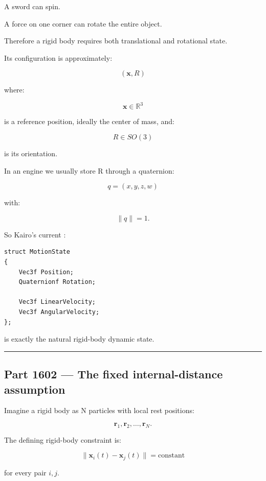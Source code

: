 A sword can spin.

A force on one corner can rotate the entire object.

Therefore a rigid body requires both translational and rotational state.

Its configuration is approximately:

\[
(\mathbf{x},R)
\]

where:

\[
\mathbf{x}\in\mathbb{R}^{3}
\]

is a reference position, ideally the center of mass, and:

\[
R\in SO(3)
\]

is its orientation.

In an engine we usually store R through a quaternion:

\[
q=(x,y,z,w)
\]

with:

\[
\|q\|=1.
\]

So Kairo's current :

\begin{verbatim}
struct MotionState
{
    Vec3f Position;
    Quaternionf Rotation;

    Vec3f LinearVelocity;
    Vec3f AngularVelocity;
};
\end{verbatim}

is exactly the natural rigid-body dynamic state.

\begin{center}\rule{0.5\linewidth}{0.5pt}\end{center}

\subsection{Part 1602 --- The fixed internal-distance assumption}\label{06-engine-ii-ch034-part-1602-the-fixed-internal-distance-assumption}

\hypertarget{06-engine-ii-ch034-part-1602-the-fixed-internal-distance-assumption}{}

Imagine a rigid body as N particles with local rest positions:

\[
\mathbf{r}_1,\mathbf{r}_2,\dots,\mathbf{r}_N.
\]

The defining rigid-body constraint is:

\[
\boxed{
\|\mathbf{x}_i(t)-\mathbf{x}_j(t)\|
=
\text{constant}
}
\]

for every pair \(i,j\).

